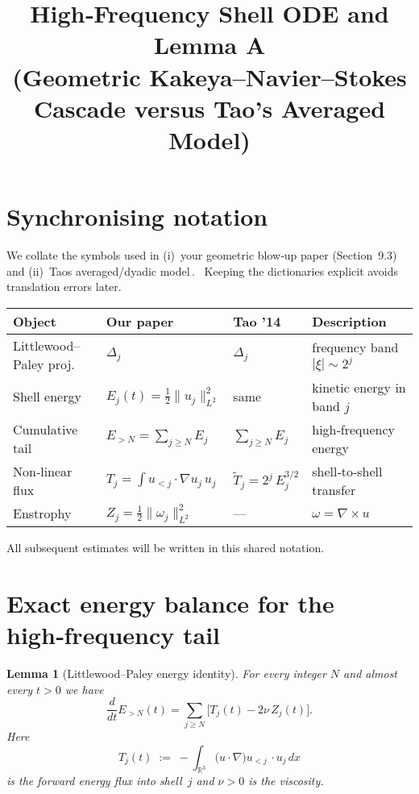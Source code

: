 \documentclass[11pt]{article}
\newtheorem{lemma}[theorem]{Lemma}
\theoremstyle{definition}
\theoremstyle{remark}
\newcommand{\LP}[1]{\Delta_{#1}}
\newcommand{\E}{E}
\newcommand{\Z}{Z}
\newcommand{\nuvisc}{\nu}
\begin{document}
\title{High‑Frequency Shell ODE and Lemma A\\(Geometric Kakeya–Navier--Stokes Cascade versus Tao's Averaged Model)}
\author{}
\date{}
\maketitle

\tableofcontents

\section{Synchronising notation}

We collate the symbols used in (i)~your geometric blow‑up paper (Section~9.3) and (ii)~Tao\textquotesingle s averaged/dyadic model\,\cite{Tao2016}.  Keeping the dictionaries explicit avoids translation errors later.

\begin{center}
\begin{tabular}{@{}llll@{}}
\toprule
\textbf{Object} & \textbf{Our paper} & \textbf{Tao '14} & \textbf{Description} \\\midrule
Littlewood--Paley proj. & $\LP{j}$ & $\LP{j}$ & frequency band $|\xi|\sim 2^{j}$ \\
Shell energy & $\displaystyle \E_j(t)=\tfrac12\|u_j\|_{L^2}^2$ & same & kinetic energy in band $j$ \\
Cumulative tail & $\displaystyle \E_{>N}=\sum_{j\ge N}\E_j$ & $\sum_{j\ge N}\E_j$ & high‑frequency energy \\
Non‑linear flux & $T_j=\int\!u_{<j}\cdot\nabla u_j\,u_j$ & $\tilde T_j = 2^{j}\,\E_j^{3/2}$ & shell‑to‑shell transfer \\
Enstrophy & $\displaystyle \Z_j=\tfrac12\|\omega_j\|_{L^2}^2$ & --- & $\omega=\nabla\times u$ \\
\bottomrule
\end{tabular}
\end{center}

\medskip
All subsequent estimates will be written in this shared notation.


\section{Exact energy balance for the high‑frequency tail}

\begin{lemma}[Littlewood--Paley energy identity]\label{lem:LP-balance}
For every integer $N$ and almost every $t>0$ we have
\begin{equation}\boxed{\frac{d}{dt}\E_{>N}(t)=\sum_{j\ge N}\bigl[T_j(t)-2\nuvisc\,\Z_j(t)\bigr].}\label{eq:LP-balance}\end{equation}
Here
\[
 T_j(t) \;:=\; -\int_{\mathbb R^3}\!\bigl(u\cdot\nabla\bigr)u_{<j}\,\cdot u_j\,dx
\]
is the forward energy flux into shell~$j$ and $\nuvisc>0$ is the viscosity.
\end{lemma}
\end{document}
